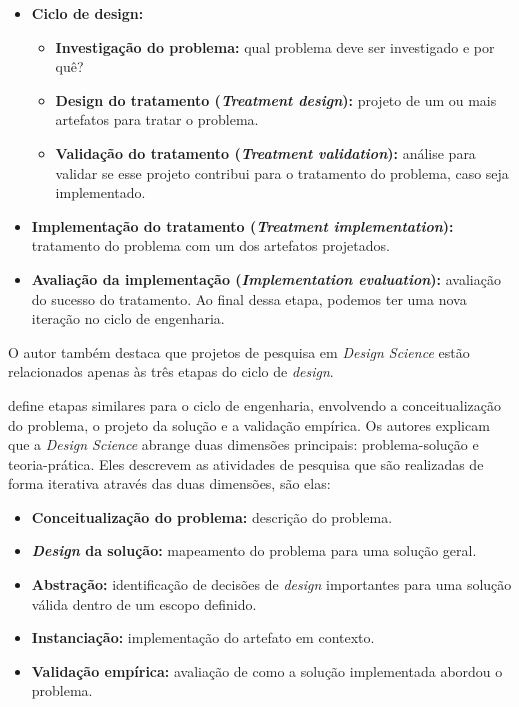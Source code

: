 \begin{itemize}
    \item \textbf{Ciclo de design:}
    \begin{itemize}
        \item \textbf{Investigação do problema:} qual problema deve ser investigado e por quê?
        \item \textbf{Design do tratamento (\textit{Treatment design}):} projeto de um ou mais artefatos para tratar o problema.
        \item \textbf{Validação do tratamento (\textit{Treatment validation}):} análise para validar se esse projeto contribui para o tratamento do problema, caso seja implementado.
    \end{itemize}
    \item \textbf{Implementação do tratamento (\textit{Treatment implementation}):} tratamento do problema com um dos artefatos projetados.
    \item \textbf{Avaliação da implementação (\textit{Implementation evaluation}):} avaliação do sucesso do tratamento. Ao final dessa etapa, podemos ter uma nova iteração no ciclo de engenharia.
\end{itemize}

\noindent O autor também destaca que projetos de pesquisa em \textit{Design Science} estão relacionados apenas às três etapas do ciclo de \textit{design}.

\citet{runeson2020design} define etapas similares para o ciclo de engenharia, envolvendo a conceitualização do problema, o projeto da solução e a validação empírica. Os autores explicam que a \textit{Design Science} abrange duas dimensões principais: problema-solução e teoria-prática. Eles descrevem as atividades de pesquisa que são realizadas de forma iterativa através das duas dimensões, são elas:

\begin{itemize}
    \item \textbf{Conceitualização do problema:} descrição do problema.
    \item \textbf{\textit{Design} da solução:} mapeamento do problema para uma solução geral.
    \item \textbf{Abstração:} identificação de decisões de \textit{design} importantes para uma solução válida dentro de um escopo definido.
    \item \textbf{Instanciação:} implementação do artefato em contexto.
    \item \textbf{Validação empírica:} avaliação de como a solução implementada abordou o problema.
\end{itemize}

